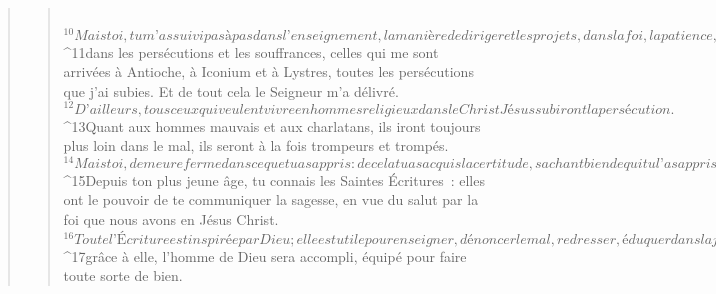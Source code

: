 \begin{verse}
\begin{verse}
         
${}^{10}Mais toi, tu m’as suivi pas à pas dans l’enseignement, la manière de diriger et les projets, dans la foi, la patience, la charité et la persévérance, 
${}^{11}dans les persécutions et les souffrances, celles qui me sont arrivées à Antioche, à Iconium et à Lystres, toutes les persécutions que j’ai subies. Et de tout cela le Seigneur m’a délivré. 
${}^{12}D’ailleurs, tous ceux qui veulent vivre en hommes religieux dans le Christ Jésus subiront la persécution. 
${}^{13}Quant aux hommes mauvais et aux charlatans, ils iront toujours plus loin dans le mal, ils seront à la fois trompeurs et trompés. 
${}^{14}Mais toi, demeure ferme dans ce que tu as appris : de cela tu as acquis la certitude, sachant bien de qui tu l’as appris. 
${}^{15}Depuis ton plus jeune âge, tu connais les Saintes Écritures : elles ont le pouvoir de te communiquer la sagesse, en vue du salut par la foi que nous avons en Jésus Christ. 
${}^{16}Toute l’Écriture est inspirée par Dieu ; elle est utile pour enseigner, dénoncer le mal, redresser, éduquer dans la justice ; 
${}^{17}grâce à elle, l’homme de Dieu sera accompli, équipé pour faire toute sorte de bien.
      

\end{verse}
\end{verse}
